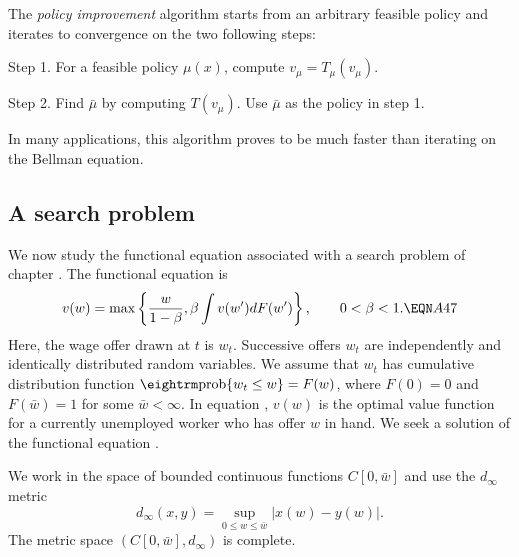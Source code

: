The {\it policy improvement\/} algorithm starts from an
arbitrary feasible policy and  iterates to convergence
on the two following steps:

Step 1. For a feasible policy $\mu(x)$, compute
$ v_{\mu} = T_{\mu}(v_{\mu})$.

Step 2. Find ${\bar \mu}$ by computing $T(v_{\mu})$.  Use $\bar \mu$
as the policy in step 1.

\noindent In many applications, this algorithm proves to be much faster
than iterating on the Bellman equation.

\subsection{A search problem}

We now study the functional equation associated with a search problem of
chapter .  The functional equation is
$$v(w)=\max \left\{ {w\over 1-\be}, \be \int v(w') dF(w')\right\}, \qquad 0<\be
<1. \EQN A47 $$
Here, the wage offer drawn at $t$ is $w_t$.  Successive offers $w_t$ are
independently and identically distributed random variables.  We assume that
$w_t$ has cumulative distribution function $\prob\{w_t\le w\}=F(w)$, where
$F(0)=0$ and $F(\bar w) =1$ for some $\bar w<\infty$.  In equation , $v(w)$ is the
optimal value function for a currently unemployed worker who has offer $w$ in
hand.  We seek a solution of the functional equation .

We work in the space of bounded continuous functions $C[0,\bar w]$ and use the
$d_\infty$ metric
$$d_\infty(x,y) =\sup_{0\le w\le \bar w} |x(w)-y(w)|.$$
The metric space $(C[0,\bar w],d_\infty)$ is complete.

